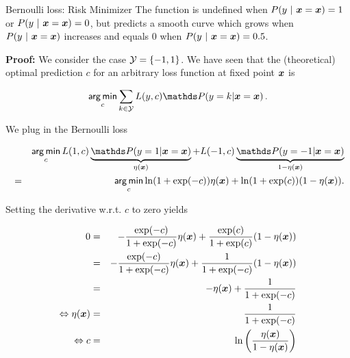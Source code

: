 \begin{vbframe}{Bernoulli loss: Risk Minimizer}
The function is undefined when $P(y~|~\bm{x} = \bm{x}) = 1$ or $P(y~|~\bm{x} = \bm{x}) = 0$, but predicts a smooth curve which grows when $P(y~|~\bm{x} = \bm{x})$ increases and equals $0$ when $P(y~|~\bm{x} = \bm{x}) = 0.5$.

\lz 

\textbf{Proof: } We consider the case $\mathcal{Y} = \{-1, 1\}$. We have seen that the (theoretical) optimal prediction $c$ for an arbitrary loss function at fixed point $\bm{x}$ is

$$
\argmin_{c} \sum_{k \in \Yspace} L(y, c) \P(y = k| \xv = \xv)\,.
$$

\framebreak 

We plug in the Bernoulli loss

\vspace*{-0.3cm}

\begin{footnotesize}
  \begin{eqnarray*}
    && \argmin_c L(1, c) \underbrace{\P(y = 1| \xv = \xv)}_{\eta(\xv)} + L(-1, c) \underbrace{\P(y = -1| \xv = \xv)}_{1 - \eta(\xv)} \\ 
    &=&  \argmin_c \ln(1 + \exp(-c)) \eta(\xv)+ \ln(1 + \exp(c)) (1 - \eta(\xv)).
  \end{eqnarray*}
\end{footnotesize}

\vspace*{-0.3cm}

Setting the derivative w.r.t. $c$ to zero yields

\vspace*{-0.3cm}

\begin{footnotesize}
  \begin{eqnarray*}
  0 &=& - \frac{\exp(-c)}{1 + \exp(-c)} \eta(\bm{x}) + \frac{\exp(c)}{1 + \exp(c)} (1 - \eta(\bm{x})) \\ 
   &=& - \frac{\exp(-c)}{1 + \exp(-c)} \eta(\bm{x}) + \frac{1}{1 + \exp(- c)} (1 - \eta(\bm{x})) \\ 
  &=& - \eta(\bm{x}) + \frac{1}{1 + \exp(-c)} \\
  \Leftrightarrow \eta(\bm{x}) &=& \frac{1}{1 + \exp(-c)} \\
  \Leftrightarrow c &=& \ln\left(\frac{\eta(\bm{x})}{1 - \eta(\bm{x})}\right)
  \end{eqnarray*}
\end{footnotesize}






\end{vbframe}



